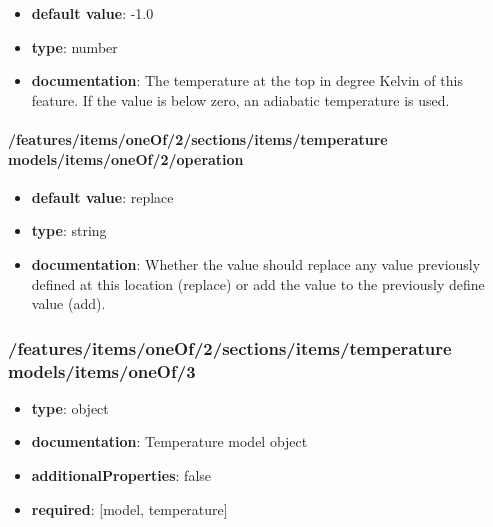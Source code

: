 \begin{itemize}\item {\bf default value}: -1.0
\item {\bf type}: number
\item {\bf documentation}: The temperature at the top in degree Kelvin of this feature. If the value is below zero, an adiabatic temperature is used.
\end{itemize}\paragraph{/features/items/oneOf/2/sections/items/temperature models/items/oneOf/2/operation}
\begin{itemize}\item {\bf default value}: replace
\item {\bf type}: string
\item {\bf documentation}: Whether the value should replace any value previously defined at this location (replace) or add the value to the previously define value (add).
\end{itemize}\subsubsection{/features/items/oneOf/2/sections/items/temperature models/items/oneOf/3}
\begin{itemize}\item {\bf type}: object
\item {\bf documentation}: Temperature model object
\item {\bf additionalProperties}: false
\item {\bf required}: [model, temperature]\end{itemize}
